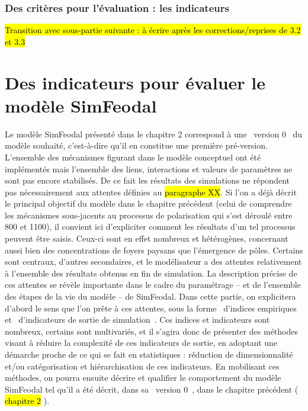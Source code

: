 \subsubsection{Des critères pour l'évaluation : les indicateurs}

\hl{Transition avec sous-partie suivante : à écrire après les corrections/reprises de 3.2 et 3.3}


\clearpage
\section[Des indicateurs pour SimFeodal]{Des indicateurs pour évaluer le modèle SimFeodal}

Le modèle SimFeodal présenté dans le chapitre 2 correspond à une \og version 0 \fg{} du modèle souhaité, c'est-à-dire qu'il en constitue une première pré-version.
	L'ensemble des mécanismes figurant dans le modèle conceptuel ont été implémentés mais l'ensemble des liens, interactions et valeurs de paramètres ne sont pas encore stabilisés.
	De ce fait les résultats des simulations ne répondent pas nécessairement aux attentes définies au \hl{paragraphe XX}.
	Si l'on a déjà décrit le principal objectif du modèle dans le chapitre précédent (celui de comprendre les mécanismes sous-jacents au processus de polarisation qui s'est déroulé entre 800 et 1100), il convient ici d'expliciter comment les résultats d'un tel processus peuvent être saisis.
Ceux-ci sont en effet nombreux et hétérogènes, concernant aussi bien des concentrations de foyers paysans que l'émergence de pôles.
Certains sont centraux, d'autres secondaires, et le modélisateur a des attentes relativement à l'ensemble des résultats obtenus en fin de simulation.
La description précise de ces attentes se révèle importante dans le cadre du paramétrage -- et de l'ensemble des étapes de la vie du modèle -- de SimFeodal.
Dans cette partie, on explicitera d'abord le sens que l'on prête à ces attentes, sous la forme \og d'indices empiriques \fg{} et \og d'indicateurs de sortie de simulation \fg{}.
Ces indices et indicateurs sont nombreux, certains sont multivariés, et il s'agira donc de présenter des méthodes visant à réduire la complexité de ces indicateurs de sortie, en adoptant une démarche proche de ce qui se fait en statistiques : réduction de dimensionnalité et/ou catégorisation et hiérarchisation de ces indicateurs.
En mobilisant ces méthodes, on pourra ensuite décrire et qualifier le comportement du modèle SimFeodal tel qu'il a été décrit, dans sa \og version 0 \fg{}, dans le chapitre précédent (
\hl{chapitre 2}
).

